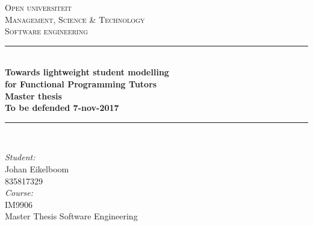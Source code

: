 \begin{titlepage}

\newcommand{\HRule}{\rule{\linewidth}{0.5mm}} %

\begin{center} %
 

\textsc{\LARGE Open universiteit}\\[1.5cm] %
\textsc{\Large Management, Science \& Technology}\\[0.5cm] %
\textsc{\large Software engineering}\\[1cm] %


\HRule \\[0.4cm]
{ \huge \bfseries  Towards lightweight student modelling \\[0.4cm] for  Functional Programming Tutors}\\[0.4cm] %
{ \large  \bfseries Master thesis}\\[0.1cm] %
{ \large  \bfseries To be defended  7-nov-2017}\\[0.4cm] %
\HRule \\[2.5cm]
 

\begin{minipage}{0.49\textwidth}
\begin{flushleft} \large
\emph{Student:}\\
Johan Eikelboom\\ %
835817329\\[1cm]
\emph{Course:}\\
IM9906\\
Master Thesis Software Engineering\\[0.5cm]



\end{flushleft}
\end{minipage}
\end{center}
\end{titlepage}
